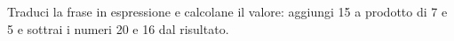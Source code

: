 \item Traduci la frase in espressione e calcolane il valore: aggiungi 15 a prodotto di 7 e 5 e sottrai i numeri 20 e 16 dal risultato.